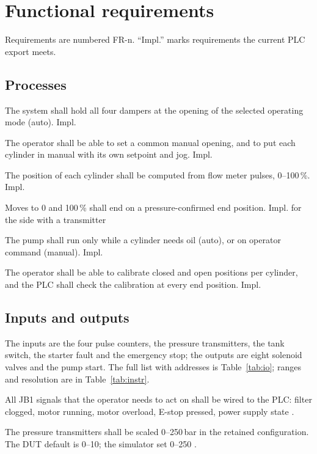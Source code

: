 \documentclass[11pt,a4paper]{article}
\begin{document}
\section{Functional requirements}
\label{sec:freq}
Requirements are numbered FR-n. ``Impl.'' marks requirements the current PLC export meets.

\subsection{Processes}
\begin{description}[nosep, leftmargin=14mm, style=sameline]
  \item[FR-1] The system shall hold all four dampers at the opening of the selected operating mode
        (auto). \hfill Impl.
  \item[FR-2] The operator shall be able to set a common manual opening, and to put each cylinder
        in manual with its own setpoint and jog. \hfill Impl.
  \item[FR-3] The position of each cylinder shall be computed from flow meter pulses, 0--100\,\%.
        \hfill Impl.
  \item[FR-4] Moves to 0 and 100\,\% shall end on a pressure-confirmed end position. \hfill Impl.
        for the side with a transmitter 
  \item[FR-5] The pump shall run only while a cylinder needs oil (auto), or on operator command
        (manual). \hfill Impl.
  \item[FR-6] The operator shall be able to calibrate closed and open positions per cylinder, and
        the PLC shall check the calibration at every end position. \hfill Impl.
\end{description}

\subsection{Inputs and outputs}
The inputs are the four pulse counters, the pressure transmitters, the tank switch, the starter
fault and the emergency stop; the outputs are eight solenoid valves and the pump start. The full
list with addresses is Table~\ref{tab:io}; ranges and resolution are in Table~\ref{tab:instr}.
\begin{description}[nosep, leftmargin=14mm, style=sameline]
  \item[FR-7] All JB1 signals that the operator needs to act on shall be wired to the PLC:
        filter clogged, motor running, motor overload, E-stop pressed, power supply state
        .
  \item[FR-8] The pressure transmitters shall be scaled 0--250\,bar in the retained configuration.
        The DUT default is 0--10; the simulator  set 0--250 .
\end{description}
\end{document}
